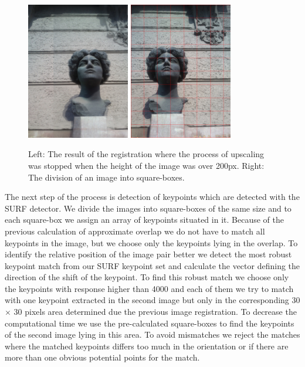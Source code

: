 \begin{figure}[h]
\centerline{
\includegraphics[width=4.5cm]{img/ema_overlap.png}
\includegraphics[width=4.5cm]{img/ema_buckets.png}}
\caption{Left: The result of the registration where the process of upscaling was stopped when the height of the image was over 200px. Right: The division of an image into square-boxes.}
\label{fig:overlap}
\end{figure}

The next step of the process is detection of keypoints which are detected with the SURF detector.
We divide the images into square-boxes of the same size and to each square-box we assign an array of keypoints situated in it.
Because of the previous calculation of approximate overlap we do not have to match all keypoints in the image, but we choose only the keypoints lying in the overlap.
To identify the relative position of the image pair better we detect the most robust keypoint match from our SURF keypoint set and calculate the vector defining the direction of the shift of the keypoint.
To find this robust match we choose only the keypoints with response higher than 4000 and %
each of them we try to match with one keypoint extracted in the second image but only in the corresponding 30 $\times$ 30 pixels area determined due the previous image registration.
To decrease the computational time we use the pre-calculated square-boxes to find the keypoints of the second image lying in this area.
To avoid mismatches we reject the matches where the matched keypoints differs too much in the orientation or if there are more than one obvious potential points for the match.


